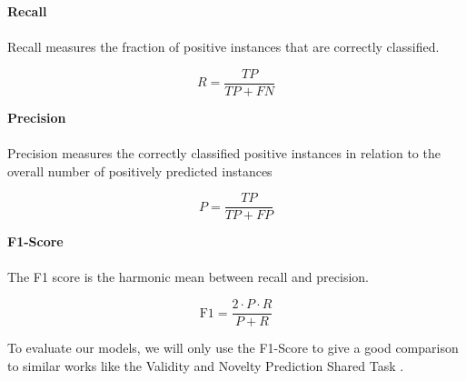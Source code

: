 \textbf{Recall} \\ \\
Recall measures the fraction of positive instances that are correctly classified.

\begin{equation}
	R = \frac{TP}{TP + FN}
\end{equation}

\textbf{Precision} \\ \\
Precision measures the correctly classified positive instances in relation to the overall number of positively predicted instances

\begin{equation}
	P = \frac{TP}{TP + FP}
\end{equation}

\textbf{F1-Score} \\ \\
The F1 score is the harmonic mean between recall and precision.

\begin{equation}
	\text{F1} = \frac{2 \cdot P \cdot R}{P + R}
\end{equation}

To evaluate our models, we will only use the F1-Score to give a good comparison to similar works like the Validity and Novelty Prediction Shared Task \cite{argsvalnov2022}.